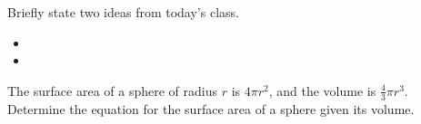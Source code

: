 \postClass

\begin{problem}
\item Briefly state two ideas from today's class.
  \begin{itemize}
  \item 
  \item 
  \end{itemize}
\item The surface area of a sphere of radius $r$ is $4\pi r^2$, and
  the volume is $\frac{4}{3}\pi r^3$. Determine the equation for the
  surface area of a sphere given its volume.
\end{problem}



